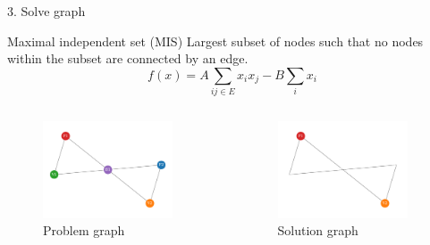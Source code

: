 \documentclass[handout]{beamer}
\begin{document}
\begin{frame}{3. Solve graph}
    \begin{alertblock}{Maximal independent set (MIS)}
        \vspace{0.1em}
        Largest subset of nodes such that no nodes within the subset are connected by an edge.
        \begin{equation*}
            f(x)=A\sum_{ij\in E}x_ix_j-B\sum_i x_i
        \end{equation*}
    \end{alertblock}
    \begin{columns}
        \begin{column}{0.5\textwidth}
            \begin{figure}
                \includegraphics[width=0.9\textwidth]{../Figures/toy_graph.pdf}
                \caption{Problem graph}
            \end{figure}
        \end{column}
        \begin{column}{0.5\textwidth}
            \begin{figure}
                \includegraphics[width=0.9\textwidth]{../Figures/toy_solution.pdf}
                \caption{Solution graph}
            \end{figure}
        \end{column}
    \end{columns}
\end{frame}
\end{document}
